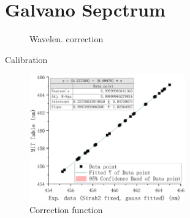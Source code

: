 \documentclass[aspectratio=43,handout]{ctexbeamer}
\begin{document}
	\section{Galvano Sepctrum}
	\begin{frame}{\insertsection}
		\begin{figure}[H]
			\centering
			\caption{Wavelen. correction}
		\end{figure}
	\end{frame}
	\begin{frame}{\insertsection}{Calibration}
		\begin{figure}[H]
			\centering
			\includegraphics[width=0.6\textwidth]{fitfunc.pdf}
			\caption{Correction function}
		\end{figure}
	\end{frame}
\end{document}

